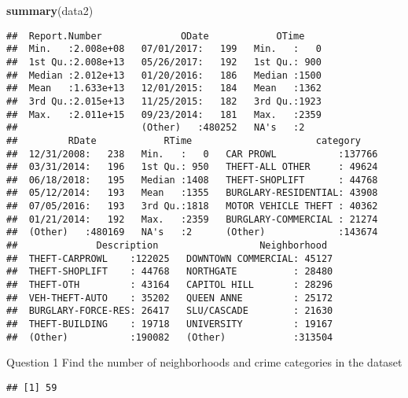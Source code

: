 \documentclass[]{article}
\newenvironment{Shaded}{\begin{snugshade}}{\end{snugshade}}
\newcommand{\CommentTok}[1]{\textcolor[rgb]{0.56,0.35,0.01}{\textit{#1}}}
\newcommand{\KeywordTok}[1]{\textcolor[rgb]{0.13,0.29,0.53}{\textbf{#1}}}
\newcommand{\NormalTok}[1]{#1}
\newcommand{\OperatorTok}[1]{\textcolor[rgb]{0.81,0.36,0.00}{\textbf{#1}}}
\begin{document}
\begin{Shaded}
\begin{Highlighting}[]
\KeywordTok{summary}\NormalTok{(data2)}
\end{Highlighting}
\end{Shaded}

\begin{verbatim}
##  Report.Number              ODate            OTime     
##  Min.   :2.008e+08   07/01/2017:   199   Min.   :   0  
##  1st Qu.:2.008e+13   05/26/2017:   192   1st Qu.: 900  
##  Median :2.012e+13   01/20/2016:   186   Median :1500  
##  Mean   :1.633e+13   12/01/2015:   184   Mean   :1362  
##  3rd Qu.:2.015e+13   11/25/2015:   182   3rd Qu.:1923  
##  Max.   :2.011e+15   09/23/2014:   181   Max.   :2359  
##                      (Other)   :480252   NA's   :2     
##         RDate            RTime                      category     
##  12/31/2008:   238   Min.   :   0   CAR PROWL           :137766  
##  03/31/2014:   196   1st Qu.: 950   THEFT-ALL OTHER     : 49624  
##  06/18/2018:   195   Median :1408   THEFT-SHOPLIFT      : 44768  
##  05/12/2014:   193   Mean   :1355   BURGLARY-RESIDENTIAL: 43908  
##  07/05/2016:   193   3rd Qu.:1818   MOTOR VEHICLE THEFT : 40362  
##  01/21/2014:   192   Max.   :2359   BURGLARY-COMMERCIAL : 21274  
##  (Other)   :480169   NA's   :2      (Other)             :143674  
##              Description                  Neighborhood   
##  THEFT-CARPROWL    :122025   DOWNTOWN COMMERCIAL: 45127  
##  THEFT-SHOPLIFT    : 44768   NORTHGATE          : 28480  
##  THEFT-OTH         : 43164   CAPITOL HILL       : 28296  
##  VEH-THEFT-AUTO    : 35202   QUEEN ANNE         : 25172  
##  BURGLARY-FORCE-RES: 26417   SLU/CASCADE        : 21630  
##  THEFT-BUILDING    : 19718   UNIVERSITY         : 19167  
##  (Other)           :190082   (Other)            :313504
\end{verbatim}

Question 1 Find the number of neighborhoods and crime categories in the
dataset

\begin{Shaded}
\end{Shaded}

\begin{verbatim}
## [1] 59
\end{verbatim}
\end{document}
